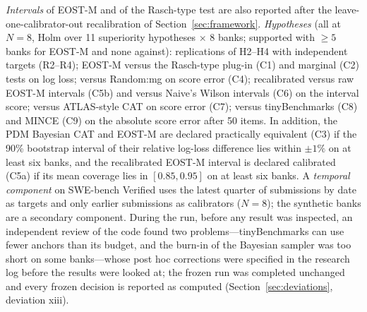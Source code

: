 \emph{Intervals} of EOST-M and of the Rasch-type test are also reported after the
leave-one-calibrator-out recalibration of Section~\ref{sec:framework}. \emph{Hypotheses}
(all at $N=8$, Holm over 11 superiority hypotheses $\times$ 8 banks; supported with
$\ge5$ banks for EOST-M and none against): replications of H2--H4 with independent targets
(R2--R4); EOST-M versus the Rasch-type plug-in (C1) and marginal (C2) tests on log loss;
versus Random:mg on score error (C4); recalibrated versus raw EOST-M intervals (C5b) and
versus Naive's Wilson intervals (C6) on the interval score; versus ATLAS-style CAT on score
error (C7); versus tinyBenchmarks (C8) and MINCE (C9) on the absolute score error after 50
items. In addition, the PDM Bayesian CAT and EOST-M are declared practically equivalent
(C3) if the 90\% bootstrap interval of their relative log-loss difference lies within
$\pm1\%$ on at least six banks, and the recalibrated EOST-M interval is declared calibrated
(C5a) if its mean coverage lies in $[0.85,0.95]$ on at least six banks. A \emph{temporal
component} on SWE-bench Verified uses the latest quarter of submissions by date as targets
and only earlier submissions as calibrators ($N=8$); the synthetic banks are a secondary
component. During the run, before any result was inspected, an independent review of the
code found two problems---tinyBenchmarks can use fewer anchors than its budget, and the
burn-in of the Bayesian sampler was too short on some banks---whose post hoc
corrections were specified in the research log before the results were looked at; the
frozen run was completed unchanged and every frozen decision is reported as computed
(Section~\ref{sec:deviations}, deviation xiii).


